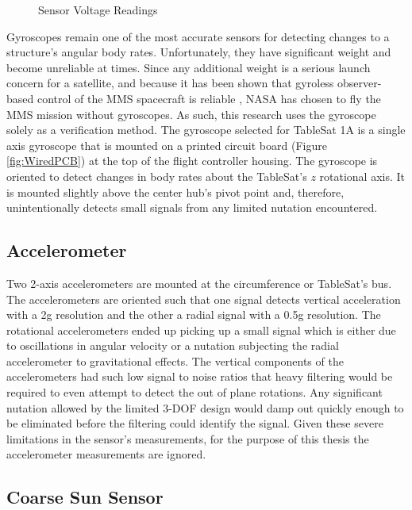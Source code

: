 \begin{figure}[H]
  \centerline{}
  \caption{Sensor Voltage Readings}
  \label{fig:SensorVoltageReadings}
\end{figure}

Gyroscopes remain one of the most accurate sensors for detecting changes to a structure's angular body rates.  Unfortunately, they have significant weight and become unreliable at times.  Since any additional weight is a serious launch concern for a satellite, and because it has been shown that gyroless observer-based control of the MMS spacecraft is reliable \cite{mushawehthesis}, NASA has chosen to fly the MMS mission without gyroscopes.  As such, this research uses the gyroscope solely as a verification method.  The gyroscope selected for TableSat 1A is a single axis gyroscope that is mounted on a printed circuit board (Figure \ref{fig:WiredPCB}) at the top of the flight controller housing.  The gyroscope is oriented to detect changes in body rates about the TableSat's $z$ rotational axis.  It is mounted slightly above the center hub's pivot point and, therefore, unintentionally detects small signals from any limited nutation encountered.

\subsection{Accelerometer}
\label{subsec:Accelerometer}

Two 2-axis accelerometers are mounted at the circumference or TableSat's bus.  The accelerometers are oriented such that one signal detects vertical acceleration with a 2g resolution and the other a radial signal with a 0.5g resolution.  The rotational accelerometers ended up picking up a small signal which is either due to oscillations in angular velocity or a nutation subjecting the radial accelerometer to gravitational effects.  The vertical components of the accelerometers had such low signal to noise ratios that heavy filtering would be required to even attempt to detect the out of plane rotations.  Any significant nutation allowed by the limited 3-DOF design would damp out quickly enough to be eliminated before the filtering could identify the signal.  Given these severe limitations in the sensor's measurements, for the purpose of this thesis the accelerometer measurements are ignored.

\subsection{Coarse Sun Sensor}
\label{subsec:CoarseSunSensor}

